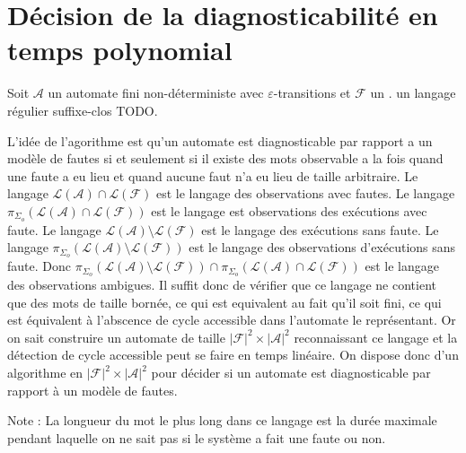 \documentclass[10pt,a4paper]{article}
\begin{document}
\section{D\'ecision de la diagnosticabilit\'e en temps polynomial}

Soit $\mathcal A$ un automate fini non-d\'eterministe avec $\varepsilon$-transitions et $\mathcal F$ un . un langage r\'egulier suffixe-clos TODO.

L'id\'ee de l'agorithme est qu'un automate est diagnosticable par rapport a un mod\`ele de fautes si et seulement si il existe des mots observable a la fois quand une faute a eu lieu et quand aucune faut n'a eu lieu de taille arbitraire. Le langage $\mathcal L (\mathcal A) \cap \mathcal L(\mathcal F)$ est le langage des observations avec fautes. Le langage $\pi_{\Sigma_o}(\mathcal L (\mathcal A) \cap \mathcal L(\mathcal F))$ est le langage est observations des ex\'ecutions avec faute. Le langage $\mathcal L(\mathcal A) \setminus \mathcal L(\mathcal F)$ est le langage des ex\'ecutions sans faute. Le langage $\pi_{\Sigma_o}(\mathcal L(\mathcal A) \setminus \mathcal L(\mathcal F))$ est le langage des observations d'ex\'ecutions sans faute. Donc $\pi_{\Sigma_o}(\mathcal L(\mathcal A) \setminus \mathcal L(\mathcal F)) \cap \pi_{\Sigma_o}(\mathcal L (\mathcal A) \cap \mathcal L(\mathcal F))$ est le langage des observations ambigues. Il suffit donc de v\'erifier que ce langage ne contient que des mots de taille born\'ee, ce qui est equivalent au fait qu'il soit fini, ce qui est \'equivalent \`a l'abscence de cycle accessible dans l'automate le repr\'esentant. Or on sait construire un automate de taille $|\mathcal F|^2 \times |\mathcal A|^2$ reconnaissant ce langage et la d\'etection de cycle accessible peut se faire en temps lin\'eaire. On dispose donc d'un algorithme en $|\mathcal F|^2 \times |\mathcal A|^2$ pour d\'ecider si un automate est diagnosticable par rapport \`a un mod\`ele de fautes.

Note : La longueur du mot le plus long dans ce langage est la dur\'ee maximale pendant laquelle on ne sait pas si le syst\`eme a fait une faute ou non.
\end{document}
